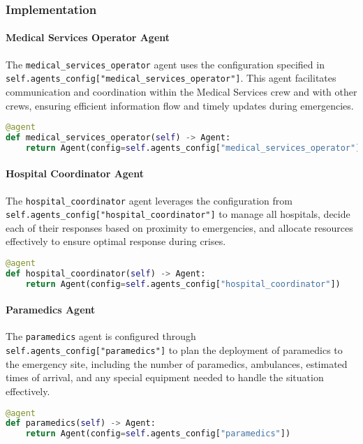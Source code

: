 \subsubsection{Implementation}

\paragraph{Medical Services Operator Agent}
The \texttt{medical\_services\_operator} agent uses the configuration specified in \texttt{self.agents\_config["medical\_services\_operator"]}. This agent facilitates communication and coordination within the Medical Services crew and with other crews, ensuring efficient information flow and timely updates during emergencies.

\begin{lstlisting}[language=Python]
@agent
def medical_services_operator(self) -> Agent:
    return Agent(config=self.agents_config["medical_services_operator"])
\end{lstlisting}

\paragraph{Hospital Coordinator Agent}
The \texttt{hospital\_coordinator} agent leverages the configuration from \newline \texttt{self.agents\_config["hospital\_coordinator"]} to manage all hospitals, decide each of their responses based on proximity to emergencies, and allocate resources effectively to ensure optimal response during crises.

\begin{lstlisting}[language=Python]
@agent
def hospital_coordinator(self) -> Agent:
    return Agent(config=self.agents_config["hospital_coordinator"])
\end{lstlisting}

\paragraph{Paramedics Agent}
The \texttt{paramedics} agent is configured through \texttt{self.agents\_config["paramedics"]} to plan the deployment of paramedics to the emergency site, including the number of paramedics, ambulances, estimated times of arrival, and any special equipment needed to handle the situation effectively.

\begin{lstlisting}[language=Python]
@agent
def paramedics(self) -> Agent:
    return Agent(config=self.agents_config["paramedics"])
\end{lstlisting}

